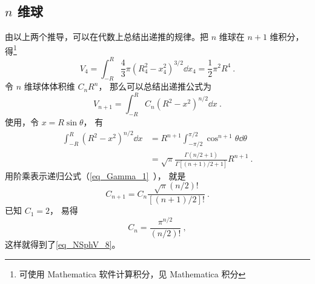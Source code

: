 \subsection{ $n$ 维球}
由以上两个推导，可以在代数上总结出递推的规律。把 $n$ 维球在 $n+1$ 维积分，得\footnote{可使用  Mathematica 软件计算积分，见 Mathematica 积分}%
\begin{equation}
V_4 = \int_{-R}^R \frac43 \pi (R_4^2 - x_4^2)^{3/2} \dd{x_4}  = \frac12 \pi^2 R^4~.
\end{equation}
令 $n$ 维球体体积维 $C_n R^n$， 那么可以总结出递推公式为
\begin{equation}
V_{n+1} = \int_{-R}^R C_n (R^2 - x^2)^{n/2}\dd{x}~.
\end{equation}
使用，令 $x = R\sin\theta$， 有
\begin{equation}
\begin{aligned}
\int_{-R}^R (R^2 - x^2)^{n/2}\dd{x} &= R^{n+1} \int_{-\pi/2}^{\pi/2} \cos^{n+1}\theta \dd{\theta}\\
&= \sqrt{\pi} \frac{\Gamma(n/2+1)}{\Gamma[(n+1)/2+1]} R^{n+1}~.
\end{aligned}
\end{equation}
用阶乘表示递归公式（\autoref{eq_Gamma_1}~）， 就是
\begin{equation}
C_{n+1} = C_n \frac{\sqrt{\pi}(n/2)!}{[(n+1)/2]!}~.
\end{equation}
已知 $C_1 = 2$， 易得
\begin{equation}
C_n = \frac{\pi^{n/2}}{(n/2)!}~,
\end{equation}
这样就得到了\autoref{eq_NSphV_8}。
